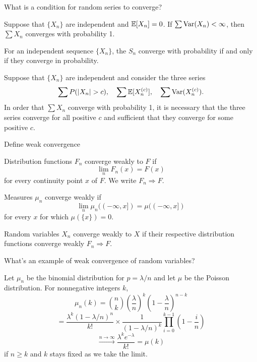 \documentclass[avery5388,grid,frame]{flashcards}
\begin{document}
\begin{flashcard}
    {What is a condition for random series to converge?}
    \begin{theorem}
        Suppose that $\{ X_n \}$ are independent and $\mathbb{E}[X_n] = 0$. If $\sum \text{Var}(X_n) < \infty$, then $\sum X_n$ converges with probability 1.
    \end{theorem}

    \begin{theorem}
        For an independent sequence $\{ X_n \}$, the $S_n$ converge with probability if and only if they converge in probability.
    \end{theorem}

    \begin{theorem}
        Suppose that $\{ X_n \}$ are independent and consider the three series
        $$\sum P(|X_n| > c), \quad \sum \mathbb{E}[X_n^{(c)}], \quad \sum \text{Var}(X_n^{(c)}).$$
        In order that $\sum X_n$ converge with probability 1, it is necessary that the three series converge for all positive $c$ and sufficient that they converge for some positive $c$.
    \end{theorem}
\end{flashcard}


\begin{flashcard}
    {Define weak convergence}
    \begin{definition}
        Distribution functions $F_n$ converge weakly to $F$ if
        $$\lim_n F_n(x) = F(x)$$
        for every continuity point $x$ of $F$. We write $F_n \Rightarrow F$.
    \end{definition}

    \begin{definition}
        Measures $\mu_n$ converge weakly if
        $$\lim_n \mu_n((-\infty,x]) = \mu((-\infty,x])$$
        for every $x$ for which $\mu(\{ x \}) = 0$.
    \end{definition}

    \begin{definition}
        Random variables $X_n$ converge weakly to $X$ if their respective distribution functions converge weakly $F_n \Rightarrow F$.
    \end{definition}
\end{flashcard}


\begin{flashcard}
    {What's an example of weak convergence of random variables?}
    \begin{remark}
        Let $\mu_n$ be the binomial distribution for $p = \lambda / n$ and let $\mu$ be the Poisson distribution. For nonnegative integers $k$,
        $$\mu_n(k) = \binom{n}{k} \left ( \frac \lambda n \right )^k \left ( 1 - \frac \lambda n \right)^{n-k}$$
        $$= \frac{\lambda^k (1 - \lambda/n)^n}{k!} \times \frac{1}{(1-\lambda/n)^k} \prod_{i=0}^{k-1}(1 - \frac i n)$$
        $$\overset{{n \rightarrow \infty}}{\rightarrow} \frac{\lambda^k e^{-\lambda}}{k!} = \mu(k)$$
        if $n \geq k$ and $k$ stays fixed as we take the limit.
    \end{remark}
\end{flashcard}
\end{document}
